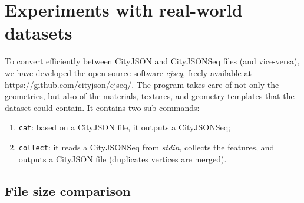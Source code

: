 \documentclass{isprs} %
\begin{document}
%
\section{Experiments with real-world datasets}%
\label{sec:experiments}


To convert efficiently between CityJSON and CityJSONSeq files (and vice-versa), we have developed the open-source software \emph{cjseq}, freely available at \url{https://github.com/cityjson/cjseq/}.
The program takes care of not only the geometries, but also of the materials, textures, and geometry templates that the dataset could contain.
It contains two sub-commands: 
\begin{enumerate}
  \item \texttt{cat}: based on a CityJSON file, it outputs a CityJSONSeq;
  \item \texttt{collect}: it reads a CityJSONSeq from \emph{stdin}, collects the features, and outputs a CityJSON file (duplicates vertices are merged).
\end{enumerate}



\subsection{File size comparison}
\end{document}
